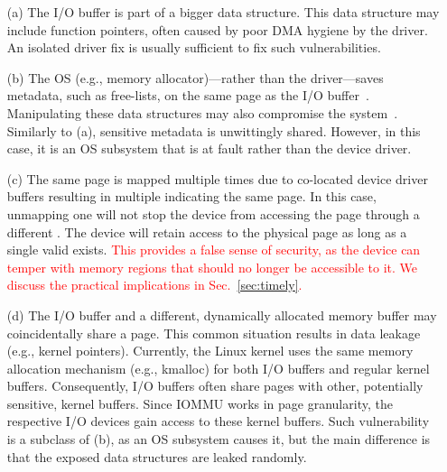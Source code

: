 \begin{enumerate}
    \item[(a)] The I/O buffer is part of a bigger data structure. This data structure may include function pointers, often caused by poor DMA hygiene by the driver. An isolated driver fix is usually sufficient to fix such vulnerabilities.
    \item[(b)] The OS (e.g., memory allocator)---rather than the driver---saves metadata, such as free-lists, on the same page as the I/O buffer~\cite{Cor07}. Manipulating these data structures may also compromise the system~\cite{ak09}. Similarly to (a), sensitive metadata is unwittingly shared. However, in this case, it is an OS subsystem that is at fault rather than the device driver.
    \item[(c)] The same page is mapped multiple times due to co-located device driver buffers resulting in multiple \iova{} indicating the same page. 
    In this case, unmapping one \iova will not stop the device from accessing the page through a different \iova.
    The device will retain access to the physical page as long as a single valid \iova{} exists. \textcolor{red}{This provides a false sense of security, as the device can temper with memory regions that should no longer be accessible to it. We discuss the practical implications in Sec.~\ref{sec:timely}.}
    \item[(d)] The I/O buffer and a different, dynamically allocated memory buffer may coincidentally share a page. This common situation results in data leakage (e.g., kernel pointers). Currently, the Linux kernel uses the same memory allocation mechanism (e.g., kmalloc) for both I/O buffers and regular kernel buffers. Consequently, I/O buffers often share pages with other, potentially sensitive, kernel buffers. Since IOMMU works in page granularity, the respective I/O devices gain access to these kernel buffers. Such vulnerability is a subclass of (b), as an OS subsystem causes it, but the main difference is that the exposed data structures are leaked randomly.
\end{enumerate}

